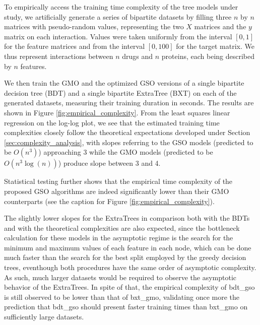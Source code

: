 To empirically access the training time complexity of the tree models under study, we artificially generate a series of bipartite datasets by filling three $n$ by $n$ matrices with pseudo-random values, representing the two $X$ matrices and the $y$ matrix on each interaction. Values were taken uniformly from the interval $[0, 1]$ for the feature matrices and from the interval $[0, 100]$ for the target matrix. We thus represent interactions between $n$ drugs and $n$ proteins, each being described by $n$ features.

We then train the GMO and the optimized GSO versions of a single bipartite decision tree (BDT) and a single bipartite ExtraTree (BXT) on each of the generated datasets, measuring their training duration in seconds. The results are shown in Figure \ref{fig:empirical_complexity}. From the least squares linear regression on the log-log plot, we see that the estimated training time complexities closely follow the theoretical expectations developed under Section \ref{sec:complexity_analysis}, with slopes referring to the GSO models (predicted to be $O(n^3)$) approaching 3 while the GMO models (predicted to be $O(n^3\log(n))$) produce slope between 3 and 4.

Statistical testing further shows that the empirical time complexity of the proposed GSO algorithms are indeed significantly lower than their GMO counterparts (see the caption for Figure \ref{fig:empirical_complexity}).


The slightly lower slopes for the ExtraTrees in comparison both with the BDTs and with the theoretical complexities are also expected, since the bottleneck calculation for these models in the asymptotic regime is the search for the minimum and maximum values of each feature in each node, which can be done much faster than the search for the best split employed by the greedy decision trees, eventhough both procedures have the same order of asymptotic complexity. As such, much larger datasets would be required to observe the asymptotic behavior of the ExtraTrees. In spite of that, the empirical complexity of bdt\_gso is still observed to be lower than that of bxt\_gmo, validating once more the prediction that bdt\_gso should present faster training times than bxt\_gmo on sufficiently large datasets.


